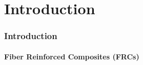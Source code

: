 \section{Introduction}


\begin{frame}

	\frametitle{Introduction}
	\framesubtitle{Fiber Reinforced Composites (FRCs)}


\end{frame}